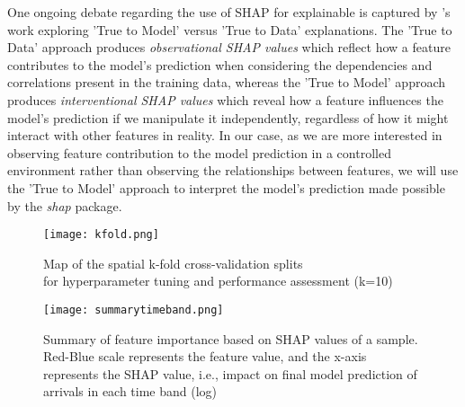 One ongoing debate regarding the use of SHAP for explainable is captured by \citet{chenTrueModelTrue2020}'s work exploring 'True to Model' versus 'True to Data' explanations. The 'True to Data' approach produces \textit{observational SHAP values} which reflect how a feature contributes to the model's prediction when considering the dependencies and correlations present in the training data, whereas the 'True to Model' approach produces \textit{interventional SHAP values} which reveal how a feature influences the model's prediction if we manipulate it independently, regardless of how it might interact with other features in reality. In our case, as we are more interested in observing feature contribution to the model prediction in a controlled environment rather than observing the relationships between features, we will use the 'True to Model' approach to interpret the model's prediction made possible by the \textit{shap} package.


\begin{figure}[ht]
    \centering
    \texttt{[image: kfold.png]}
    \captionsetup{justification=centering}
    \caption{Map of the spatial k-fold cross-validation splits\\for hyperparameter tuning and performance assessment (k=10)}
    \label{fig:kfold}
\end{figure}

\begin{figure}[!ht]
    \centering
    \texttt{[image: summarytimeband.png]}
    \captionsetup{justification=centering}
    \caption{Summary of feature importance based on SHAP values of a sample. Red-Blue scale represents the feature value, and the x-axis represents the SHAP value, i.e., impact on final model prediction of arrivals in each time band (log)}
    \label{fig:beeswarmtimeband}
\end{figure}